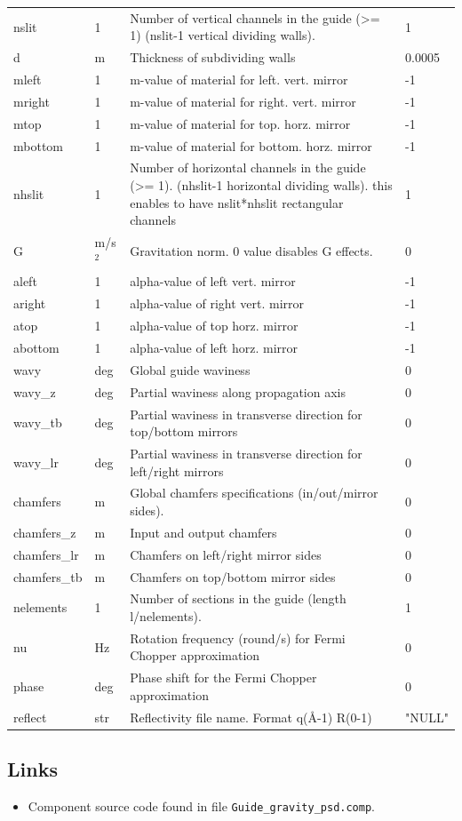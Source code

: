\begin{longtable}{p{}p{}p{}p{}}
nslit & 1 & Number of vertical channels in the guide (\textgreater{}= 1) (nslit-1 vertical dividing walls). & 1 \\
d & m & Thickness of subdividing walls & 0.0005 \\
mleft & 1 & m-value of material for left.   vert. mirror & -1 \\
mright & 1 & m-value of material for right.  vert. mirror & -1 \\
mtop & 1 & m-value of material for top.    horz. mirror & -1 \\
mbottom & 1 & m-value of material for bottom. horz. mirror & -1 \\
nhslit & 1 & Number of horizontal channels in the guide (\textgreater{}= 1). (nhslit-1 horizontal dividing walls). this enables to have nslit*nhslit rectangular channels & 1 \\
G & m/s$^{2}$ & Gravitation norm. 0 value disables G effects. & 0 \\
aleft & 1 & alpha-value of left  vert. mirror & -1 \\
aright & 1 & alpha-value of right vert. mirror & -1 \\
atop & 1 & alpha-value of top   horz. mirror & -1 \\
abottom & 1 & alpha-value of left  horz. mirror & -1 \\
wavy & deg & Global guide waviness & 0 \\
wavy\_z & deg & Partial waviness along propagation axis & 0 \\
wavy\_tb & deg & Partial waviness in transverse direction for top/bottom mirrors & 0 \\
wavy\_lr & deg & Partial waviness in transverse direction for left/right mirrors & 0 \\
chamfers & m & Global chamfers specifications (in/out/mirror sides). & 0 \\
chamfers\_z & m & Input and output chamfers & 0 \\
chamfers\_lr & m & Chamfers on left/right mirror sides & 0 \\
chamfers\_tb & m & Chamfers on top/bottom mirror sides & 0 \\
nelements & 1 & Number of sections in the guide (length l/nelements). & 1 \\
nu & Hz & Rotation frequency (round/s) for Fermi Chopper approximation & 0 \\
phase & deg & Phase shift for the Fermi Chopper approximation & 0 \\
reflect & str & Reflectivity file name. Format q(\AA{}-1) R(0-1) & "NULL" \\
\bottomrule
\end{longtable}

\subsection*{Links}
\begin{itemize}
  \item Component source code found in file \texttt{Guide\_gravity\_psd.comp}.
\end{itemize}
